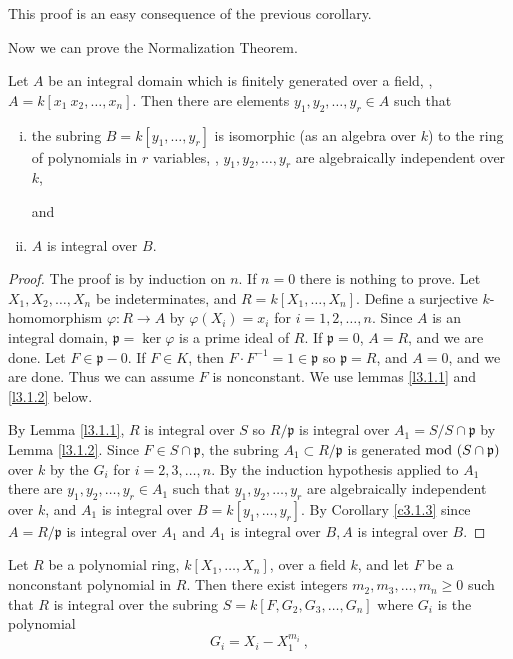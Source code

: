 This proof is an easy consequence of the previous corollary.

Now we can prove the Normalization Theorem.

\begin{theo}
\label{t3.1.1}
Let $A$ be an integral domain which is finitely generated over a field, \ie, $A=k[x_{1}\ x_{2}, \ldots, x_{n}]$. Then there are elements $y_{1}, y_{2}, \ldots, y_{r}\in A$ such that
\begin{enumerate}[(i)]
\item
the subring $B=k[y_{1}, \ldots, y_{r}]$ is isomorphic (as an algebra over $k$) to the ring of polynomials in $r$ variables, \ie, $y_{1},y_{2},\ldots,y_{r}$ are algebraically independent over $k$, 

and
\item
$A$ is integral over $B$.
\end{enumerate}
\end{theo}

\begin{proof}
The proof is by induction on $n$. If $n=0$ there is nothing to prove. Let $X_{1},X_{2}, \ldots, X_{n}$ be indeterminates, and $R=k[X_{1}, \ldots, X_{n}]$. Define a surjective $k$-homomorphism $\varphi : R\rightarrow A$ by $\varphi(X_{i})=x_{i}$ for $i=1,2, \ldots, n$. Since $A$ is an integral domain, $\mathfrak{p} =\ker \varphi$ is a prime ideal of $R$. If $\mathfrak{p} =0$, $A=R$, and we are done. Let $F\in \mathfrak{p} -0$. If $F\in K$, then $F\cdot F^{-1}=1\in \mathfrak{p}$ so $\mathfrak{p} =R$, and $A=0$, and we are done. Thus we can assume $F$ is nonconstant. We use lemmas \ref{l3.1.1} and \ref{l3.1.2} below.

By Lemma \ref{l3.1.1}, $R$ is integral over $S$ so $R/\mathfrak{p}$ is integral over $A_{1}=S/S\cap \mathfrak{p}$ by Lemma \ref{l3.1.2}. Since $F\in S\cap \mathfrak{p}$, the subring $A_{1}\subset R/\mathfrak{p}$ is generated $\operatorname{mod}\ (S\cap \mathfrak{p})$ over $k$ by the $G_{i}$ for $i=2,3,\ldots,n$. By the induction hypothesis applied to $A_{1}$ there are $y_{1},y_{2},\ldots,y_{r}\in A_{1}$ such that $y_{1},y_{2},\ldots,y_{r}$ are algebraically independent over $k$, and $A_{1}$ is integral over $B=k[y_{1},\ldots,y_{r}]$. By Corollary \ref{c3.1.3} since $A=R/\mathfrak{p}$ is integral over $A_{1}$ and $A_{1}$ is integral over $B,A$ is integral over $B$.
\end{proof}

\begin{lem}[Nagata]
\label{l3.1.1}
Let $R$ be a polynomial ring, $k[X_{1}, \ldots, X_{n}]$, over a field $k$, and let $F$ be a nonconstant polynomial in $R$. Then there exist integers $m_{2}, m_{3}, \ldots, m_{n}\geq 0$ such that $R$ is integral over the subring $S=k[F, G_{2},G_{3}, \ldots,G_{n}]$ where $G_{i}$ is the polynomial
$$
G_{i}=X_{i}-X_{1}^{m_{i}}\ ,
$$
\end{lem}

